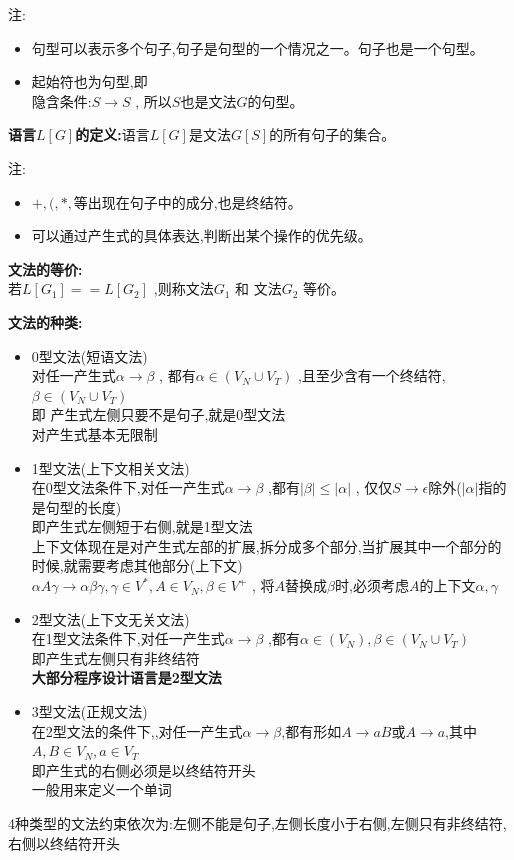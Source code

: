 注:
\begin{itemize}
 \item 句型可以表示多个句子,句子是句型的一个情况之一。句子也是一个句型。
 \item 起始符也为句型,即\\
       隐含条件:$S\to S$ , 所以$S$也是文法$G$的句型。
\end{itemize}

\spaceline
\textbf{语言$L[G]$的定义:}语言$L[G]$是文法$G[S]$的所有句子的集合。

注:
\begin{itemize}
 \item $+,(,*,$等出现在句子中的成分,也是终结符。
 \item 可以通过产生式的具体表达,判断出某个操作的优先级。
\end{itemize}

\spaceline
\textbf{文法的等价:}\\
若$L[G_1] == L[G_2]$ ,则称文法$G_1$ 和 文法$G_2$ 等价。

\spaceline
\textbf{文法的种类:}
\begin{itemize}
 \item 0型文法(短语文法)\\
       对任一产生式$\alpha \to \beta$ , 都有$\alpha \in (V_N\cup V_T)$ ,且至少含有一个终结符,$\beta \in (V_N\cup V_T)$\\
       即 产生式左侧只要不是句子,就是0型文法\\
       对产生式基本无限制
 \item 1型文法(上下文相关文法)\\
       在0型文法条件下,对任一产生式$\alpha \to \beta$ ,都有$|\beta| \leq |\alpha|$ , 仅仅$S \to \epsilon $除外($|\alpha|$指的是句型的长度)\\
       即产生式左侧短于右侧,就是1型文法\\
       上下文体现在是对产生式左部的扩展,拆分成多个部分,当扩展其中一个部分的时候,就需要考虑其他部分(上下文)\\
       $\alpha A \gamma \to \alpha \beta \gamma , \gamma \in V^* , A\in V_N , \beta \in V^+$ , 将$A$替换成$\beta$时,必须考虑$A$的上下文$\alpha , \gamma$
 \item 2型文法(上下文无关文法)\\
       在1型文法条件下,对任一产生式$\alpha \to \beta$ ,都有$\alpha \in (V_N) , \beta \in (V_N\cup V_T)$\\
       即产生式左侧只有非终结符\\
       \textbf{大部分程序设计语言是2型文法}

 \item 3型文法(正规文法)\\
       在2型文法的条件下,,对任一产生式$\alpha \to \beta$,都有形如$A\to aB$或$A \to a$,其中$A,B\in V_N , a \in V_T$\\
       即产生式的右侧必须是以终结符开头\\
       一般用来定义一个单词
\end{itemize}
4种类型的文法约束依次为:左侧不能是句子,左侧长度小于右侧,左侧只有非终结符,右侧以终结符开头

